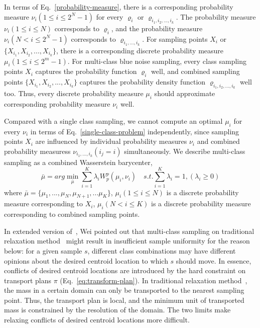In terms of Eq.~\ref{probability-measure},
there is a corresponding probability measure $\nu_i(1\leq i\leq 2^N-1)$ for every $\varrho_i$ or  $\varrho_{{i_1,i_2,...,i_k}}$.
The probability measure $\nu_i(1\leq i\leq N)$ corresponds to $\varrho_i$,
and the probability measure $\nu_i(N<i\leq 2^N-1)$ corresponds to $\varrho_{i_1,...,i_k}$.
For sampling points $X_i$ or $\{X_{i_1}, X_{i_2},...,X_{i_k}\}$,
there is a corresponding discrete probability measure $\mu_i(1\leq i\leq 2^m-1)$.
For multi-class blue noise sampling,
every class sampling points $X_i$ captures the probability function $\varrho_i$ well,
and combined sampling points $\{X_{i_1}, X_{i_2},...,X_{i_k}\}$ captures the probability density function $\varrho_{i_1,i_2,...,i_k}$ well too.
Thus,
every discrete probability measure $\mu_i$ should approximate corresponding probability measure $\nu_i$ well.

Compared with a single class sampling,
we cannot compute an optimal $\mu_i$ for every $\nu_i$ in terms of Eq.~\ref{single-class-problem} independently,
since sampling points $X_i$ are influenced by individual probability measures $\nu_i$ and combined probability measuress $\nu_{i_1,...,i_k}(i_j=i)$ simultaneously.
We describe multi-class sampling as a combined Wasserstein barycenter,
\begin{equation}\label{eq:combined-wasserstein-barycenter}
 \bar\mu=arg\min\limits_{\bar\mu}\sum\limits_{i=1}^K\lambda_iW_p^p(\mu_i,\nu_i) \quad
  s.t.\sum\limits_{i=1}^K\lambda_i=1,(\lambda_i\geq0)
\end{equation}
where $\bar\mu=\{\mu_1,...,\mu_N,\mu_{N+1},...\mu_{K}\}$,
$\mu_i(1\leq i\leq N)$  is a discrete probability measure corresponding to $X_i$,
$\mu_i(N < i\leq K)$ is a discrete probability measure corresponding to combined sampling points.

In extended version of~\cite{wei:2010:multi},
Wei pointed out that multi-class sampling on traditional relaxation method~\cite{balzer:2009:capacity}
 might result in insufficient sample
uniformity for the reason below: for a given sample $s$,
different class combinations may have different opinions about the desired centroid
location to which $s$ should move.
In essence,
conflicts of desired centroid locations are introduced by the hard constraint on transport plans $\pi$ (Eq.~\ref{eq:transform-plan}).
In traditional relaxation method~\cite{balzer:2009:capacity},
the mass in a certain domain can only be transported to the nearest sampling point.
Thus, the transport plan is local,
and the minimum unit of transported mass is constrained by the resolution of the domain.
The two limits make relaxing conflicts of desired centroid locations more difficult.

